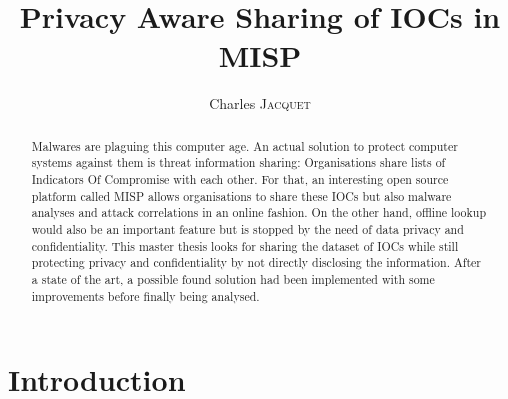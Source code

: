 \documentclass{eplmastersthesis}
\title{Privacy Aware Sharing of IOCs in MISP}	%
\author{Charles \textsc{Jacquet}}	%
\begin{document}
\maketitle					%
\thispagestyle{empty}		%


\begin{abstract} 
Malwares are plaguing this computer age. An actual solution to protect computer systems against them is threat information sharing: Organisations share lists of Indicators Of Compromise with each other.
For that, an interesting open source platform called MISP allows organisations to share these IOCs but also malware analyses and attack correlations in an online fashion.
On the other hand, offline lookup would also be an important feature but is stopped by the need of data privacy and confidentiality. This master thesis looks for sharing the dataset of IOCs while still protecting privacy and confidentiality by not directly disclosing the information. 
After a state of the art, a possible found solution had been implemented with  some improvements before finally being analysed.
\end{abstract}


\renewcommand{\abstractname}{Acknowledgements}
\begin{abstract}
\end{abstract}

\tableofcontents

\chapter{Introduction}
\end{document}
